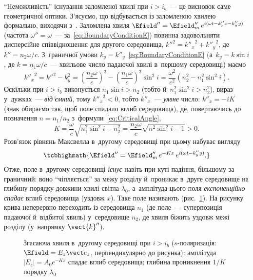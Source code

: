 \enquote{Неможливість} існування заломленої хвилі при $i>i_b$~--- це висновок саме геометричної оптики. З'ясуємо, що відбувається із заломленою
хвилею формально, виходячи з~. Заломлена хвиля $\Efield'' = \Efield''_m\, e^{i(\omega t-k''_xx-k''_yy)}$ (частота
$\omega''=\omega$~--- за~\eqref{eq:BoundaryConditionE}) повинна задовольняти дисперсійне співвідношення для другого середовища,
$k''^2={k''_x}^2+{k''_y}^2$, де $k''=n_2\omega/c$. З~граничної умови $k_y=k''_y$~\eqref{eq:BoundaryConditionE} (а~$k_y=k\sin i$, де
$k=n_1\omega/c$~--- хвильове число падаючої хвилі в~першому середовищі) маємо
\begin{equation*}
	{k''_x}^2 = k''^2-k_y^2 = \left(\frac{n_2\omega}c\right)^{\!2}-\left(\frac{n_1\omega}c\right)^{\!2}\sin^2i = \frac{\omega^2}{c^2}\left(n_2^2-n_1^2\sin^2i\right).
\end{equation*}
Оскільки при $i>i_b$ виконується $n_1\sin i>n_2$ (тобто й~$n_1^2\sin^2i>n_2^2$), вираз у~дужках~--- \emph{від'ємний}, тому ${k''_x}^2<0$, тобто
$k''_x$~--- \emph{уявне} число: $k''_x = -iK$ (знак обираємо так, щоб поле спадало вглиб середовища), де, повертаючись до позначення $n=n_1/n_2$ з~формули~\eqref{eq:CriticalAngle},
\begin{equation*}
	K = \frac\omega c\sqrt{n_1^2\sin^2i-n_2^2} = \frac{n_2\omega}c\sqrt{n^2\sin^2i-1} > 0.
\end{equation*}
Розв'язок рівнянь Максвелла в~другому середовищі при цьому набуває вигляду
\begin{equation}\label{eq:EvanescentWave}
	\tcbhighmath{
		\Efield'' = \Efield''_m\, e^{-Kx}\, e^{i(\omega t-k''_yy)}.
	}
\end{equation}
Отже, поле в~другому середовищі \emph{існує} навіть при куті падіння, більшому за граничний: воно \enquote{чіпляється} за межу розділу
й~проникає в~друге середовище на глибину порядку довжини хвилі світла $\lambda_0$, а~амплітуда цього поля \emph{експоненційно спадає}
вглиб середовища (уздовж $x$). Таке поле називають  (рис.~\ref{tikz:EvanescentWave}). На рисунку крива неперервно переходить із середовища $n_1$ (де поле~--- суперпозиція падаючої й~відбитої хвиль) у~середовище $n_2$, де хвиля біжить уздовж межі розділу (у~напрямку $\vect{k}''$).

\begin{figure}[h!]\centering
	\caption{Згасаюча хвиля в~другому середовищі при $i>i_b$ ($s$-поляризація: $\Efield=E_z\vect e_z$, перпендикулярно до рисунка): амплітуда $|E_z|=A_0e^{-Kx}$ спадає вглиб середовища; глибина проникнення $1/K$ порядку $\lambda_0$\label{tikz:EvanescentWave}}
\end{figure}

